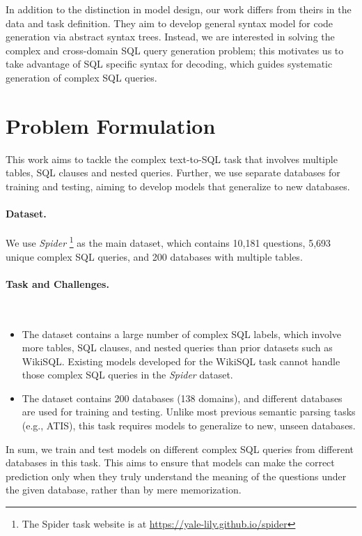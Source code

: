 \documentclass[11pt,a4paper]{article}
\begin{document}
In addition to the distinction in model design, our work differs from theirs in the data and task definition.
They aim to develop general syntax model for code generation via abstract syntax trees. Instead, we are interested in solving the complex and cross-domain SQL query generation problem; this motivates us to take advantage of SQL specific syntax for decoding, which guides systematic generation of complex SQL queries.






\section{Problem Formulation}
This work aims to tackle the complex text-to-SQL task that involves multiple tables, SQL clauses and nested queries.
Further, we use separate databases for training and testing, aiming to develop models that generalize to new databases.


\paragraph{Dataset.}
We use \textit{Spider} \cite{Yu&al.18.emnlp.corpus} \footnote{The Spider task website is at \url{https://yale-lily.github.io/spider}} as the main dataset, which contains 10,181 questions, 5,693 unique complex SQL queries, and 200 databases with multiple tables. 








\paragraph{Task and Challenges.}~\vspace{-1.5mm}
\begin{itemize}
\setlength{\itemsep}{0mm}
\setlength{\leftskip}{-4mm}
    \item The dataset contains a large number of complex SQL labels, which involve more tables, SQL clauses, and nested queries than prior datasets such as WikiSQL. Existing models developed for the WikiSQL task cannot handle those complex SQL queries in the \textit{Spider} dataset.
    
    \item The dataset contains 200 databases (138 domains), and different databases are used for training and testing.
    Unlike most previous semantic parsing tasks (e.g., ATIS), this task requires models to generalize to new, unseen databases.


\end{itemize}\vspace{-2mm}
In sum, we train and test models on different complex SQL queries from different databases in this task. This aims to ensure that models can make the correct prediction only when they truly understand the meaning of the questions under the given database, rather than by mere memorization.
\end{document}
